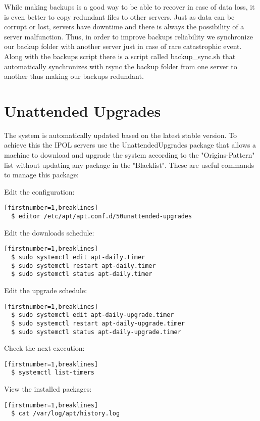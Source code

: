 \documentclass[a4paper,12pt]{article}
\begin{document}
While making backups is a good way to be able to recover in case of data loss, it is even better to copy redundant files to other servers. Just as data can be corrupt or lost, servers have downtime and there is always the possibility of a server malfunction. Thus, in order to improve backups reliability we synchronize our backup folder with another server just in case of rare catastrophic event. Along with the backups script there is a script called backup\_sync.sh that automatically synchronizes with rsync the backup folder from one server to another thus making our backups redundant.


\section{Unattended Upgrades}

The system is automatically updated based on the latest stable version. To achieve this the IPOL servers use the UnattendedUpgrades package that allows a machine to download and upgrade the system according to the "Origins-Pattern" list without updating any package in the "Blacklist". These are useful commands to manage this package: 

Edit the configuration: 
\begin{verbatim}[firstnumber=1,breaklines]
  $ editor /etc/apt/apt.conf.d/50unattended-upgrades
\end{verbatim}

Edit the downloads schedule: 
\begin{verbatim}[firstnumber=1,breaklines]
  $ sudo systemctl edit apt-daily.timer
  $ sudo systemctl restart apt-daily.timer
  $ sudo systemctl status apt-daily.timer
\end{verbatim}

Edit the upgrade schedule: 
\begin{verbatim}[firstnumber=1,breaklines]
  $ sudo systemctl edit apt-daily-upgrade.timer
  $ sudo systemctl restart apt-daily-upgrade.timer
  $ sudo systemctl status apt-daily-upgrade.timer
\end{verbatim}

Check the next execution: 
\begin{verbatim}[firstnumber=1,breaklines]
  $ systemctl list-timers
\end{verbatim}

View the installed packages: 
\begin{verbatim}[firstnumber=1,breaklines]
  $ cat /var/log/apt/history.log
\end{verbatim}
\end{document}
